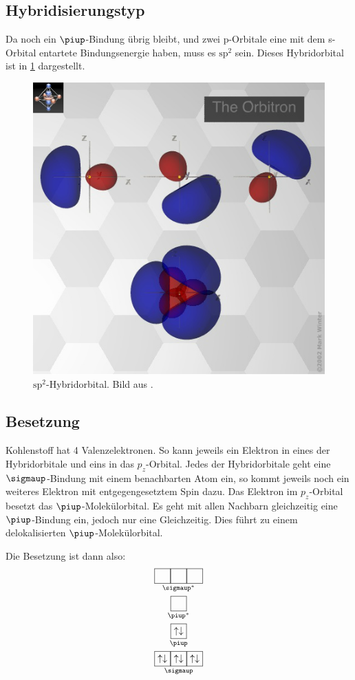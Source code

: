 \subsection{Hybridisierungstyp}

Da noch ein $\piup$-Bindung übrig bleibt, und zwei p-Orbitale eine mit dem
s-Orbital entartete Bindungsenergie haben, muss es $\mathrm{sp^2}$ sein. Dieses
Hybridorbital ist in \cref{fig:sp2} dargestellt.

\begin{figure}
	\centering
	\includegraphics[width=.5\textwidth]{sp2.png}
	\caption{%
		$\mathrm{sp^2}$-Hybridorbital. Bild aus \cite{Winter/Orbitron/sp2}.
	}
	\label{fig:sp2}
\end{figure}

\subsection{Besetzung}

Kohlenstoff hat 4 Valenzelektronen. So kann jeweils ein Elektron in eines der
Hybridorbitale und eins in das $p_z$-Orbital. Jedes der Hybridorbitale geht
eine $\sigmaup$-Bindung mit einem benachbarten Atom ein, so kommt jeweils noch
ein weiteres Elektron mit entgegengesetztem Spin dazu. Das Elektron im
$p_z$-Orbital besetzt das $\piup$-Molekülorbital. Es geht mit allen Nachbarn
gleichzeitig eine $\piup$-Bindung ein, jedoch nur eine Gleichzeitig. Dies führt
zu einem delokalisierten $\piup$-Molekülorbital.

Die Besetzung ist dann also:
\begin{gather*}
	\underset{\sigmaup^*}{\boxed{\phantom{\uparrow\downarrow}}\boxed{\phantom{\uparrow\downarrow}}\boxed{\phantom{\uparrow\downarrow}}} \\
	\underset{\piup^*}{\boxed{\phantom{\uparrow\downarrow}}} \\
	\underset{\piup}{\boxed{\uparrow\downarrow}} \\
	\underset{\sigmaup}{\boxed{\uparrow\downarrow}\boxed{\uparrow\downarrow}\boxed{\uparrow\downarrow}}
\end{gather*}

